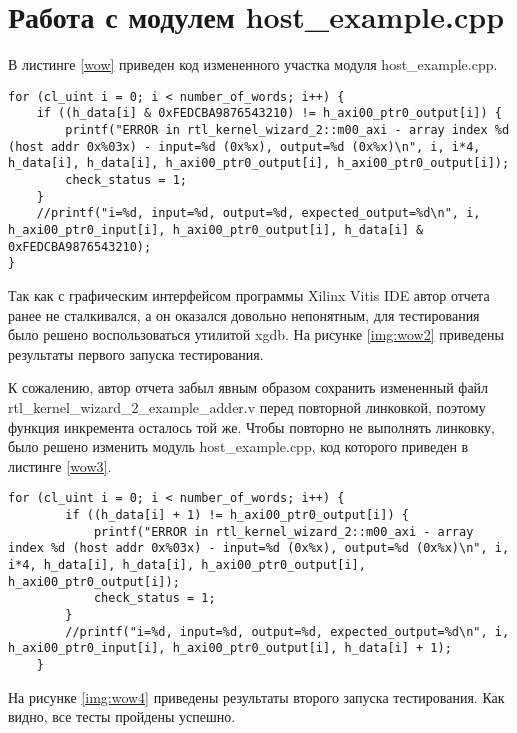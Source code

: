 \section{Работа с модулем host\_example.cpp}

В листинге \ref{wow} приведен код измененного участка модуля host\_example.cpp.
 

\begin{lstlisting}[caption=Код модифицированного модуля host\_example.cpp, label={wow}]
    for (cl_uint i = 0; i < number_of_words; i++) {
	if ((h_data[i] & 0xFEDCBA9876543210) != h_axi00_ptr0_output[i]) {
		printf("ERROR in rtl_kernel_wizard_2::m00_axi - array index %d (host addr 0x%03x) - input=%d (0x%x), output=%d (0x%x)\n", i, i*4, h_data[i], h_data[i], h_axi00_ptr0_output[i], h_axi00_ptr0_output[i]);
		check_status = 1;
	}
	//printf("i=%d, input=%d, output=%d, expected_output=%d\n", i,  h_axi00_ptr0_input[i], h_axi00_ptr0_output[i], h_data[i] & 0xFEDCBA9876543210);
}
\end{lstlisting}
 
Так как с графическим интерфейсом программы Xilinx Vitis IDE автор отчета ранее не сталкивался, а он оказался довольно непонятным, для тестирования было решено  воспользоваться утилитой xgdb. На рисунке \ref{img:wow2} приведены результаты  первого запуска тестирования.
 

К сожалению, автор отчета забыл явным образом сохранить измененный файл rtl\_kernel\_wizard\_2\_example\_adder.v перед повторной линковкой, поэтому функция инкремента осталось той же. Чтобы повторно не выполнять линковку, было решено изменить модуль host\_example.cpp, код которого приведен в листинге \ref{wow3}.


\begin{lstlisting}[caption=Код модифицированного модуля host\_example.cpp, label={wow3}]
	    for (cl_uint i = 0; i < number_of_words; i++) {
		if ((h_data[i] + 1) != h_axi00_ptr0_output[i]) {
			printf("ERROR in rtl_kernel_wizard_2::m00_axi - array index %d (host addr 0x%03x) - input=%d (0x%x), output=%d (0x%x)\n", i, i*4, h_data[i], h_data[i], h_axi00_ptr0_output[i], h_axi00_ptr0_output[i]);
			check_status = 1;
		}
		//printf("i=%d, input=%d, output=%d, expected_output=%d\n", i,  h_axi00_ptr0_input[i], h_axi00_ptr0_output[i], h_data[i] + 1);
	}
\end{lstlisting}

На рисунке \ref{img:wow4} приведены результаты  второго запуска тестирования. Как видно, все тесты пройдены успешно.

